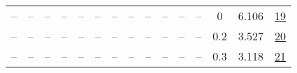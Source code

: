 \begin{table}[H]
\begin{tabular}{ccccccccccccccc}
-- & -- & -- & -- & -- & -- & -- & -- & -- & -- & -- & -- & 0 & 6.106 & \href{https://wandb.ai/stanford-mercury/optimizer-scaling/runs/sweep-520m-10B-soapere81b78alr0.008-wd0-minlr0-warmup1000-b10.95-d397e5}{19} \\
-- & -- & -- & -- & -- & -- & -- & -- & -- & -- & -- & -- & 0.2 & 3.527 & \href{https://wandb.ai/stanford-mercury/optimizer-scaling/runs/sweep-520m-10B-soapereaf2f7flr0.008-wd0.2-minlr0-warmup1000-b10.-4fca4a}{20} \\
-- & -- & -- & -- & -- & -- & -- & -- & -- & -- & -- & -- & 0.3 & 3.118 & \href{https://wandb.ai/stanford-mercury/optimizer-scaling/runs/sweep-520m-10B-soapereaaf64elr0.008-wd0.3-minlr0-warmup1000-b10.-0e5190}{21} \\
\bottomrule
\end{tabular}
\end{table}

